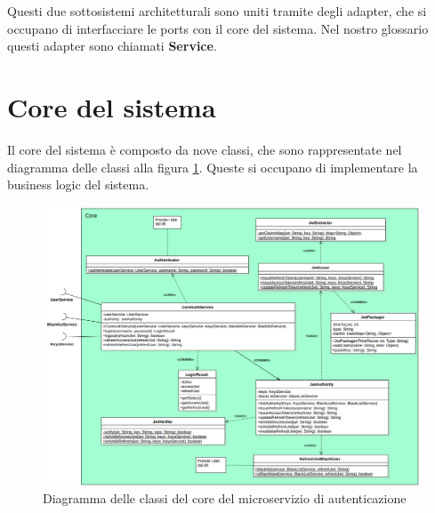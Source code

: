 Questi due sottosistemi architetturali sono uniti tramite degli adapter, che si occupano di interfacciare le ports con il core del sistema. Nel nostro glossario questi adapter sono chiamati \textbf{Service}.

\section{Core del sistema}

Il core del sistema è composto da nove classi, che sono rappresentate nel diagramma delle classi alla figura \ref{fig:classi_auth}. Queste si occupano di implementare la business logic del sistema.

\begin{figure}[ht]
    \centering
    \includegraphics[width=\textwidth]{img/classi_auth.png}
    \caption{Diagramma delle classi del core del microservizio di autenticazione}
    \label{fig:classi_auth}
\end{figure}

